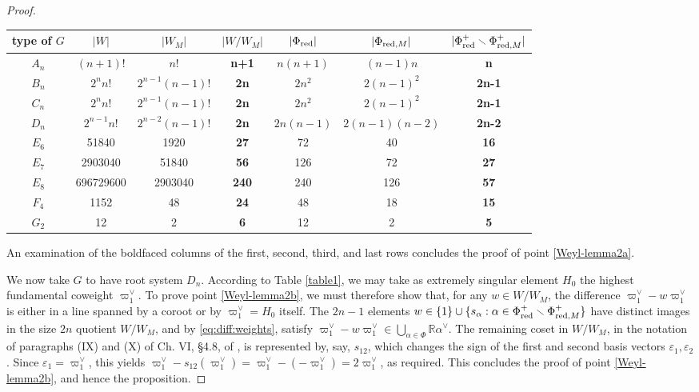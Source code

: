\documentclass[12pt]{amsart}
\theoremstyle{remark}
\newcommand{\R}{\mathbb R}
\begin{document}
\begin{proof}
\begin{table}[H]
 \begin{tabular}{|c|c|c|>{\bfseries} c|c|c|>{\bfseries}c|}
\hline  type of $G$ & $|W|$ & $|W_M|$ & $|W/W_M|$& $|\Phi_{\textnormal{red}}|$ & $|\Phi_{\textnormal{red},M}|$  & $|\Phi_{\textnormal{red}}^+ \smallsetminus \Phi_{\textnormal{red},M}^+|$ \\\hline
   $A_n$ & $(n+1)!$ & $n!$ &                            n+1&         $n(n+1)$ &  $(n-1)n$ & n\\
   $B_n$ & $2^n n!$ & $2^{n-1} (n-1)!$ &        2n &        $2n^2$ & $2(n-1)^2$ & 2n-1\\
   $C_n$ &  $2^n n!$ & $2^{n-1} (n-1)!$ &          2n &      $2n^2$ & $2(n-1)^2$ & 2n-1\\
   $D_n$ & $2^{n-1} n!$ & $2^{n-2} (n-1)!$ &        2n & $2n(n-1)$ & $2(n-1)(n-2)$ & 2n-2\\
   $E_6$ & 51840 & 1920                                       &27 & 72&   40 & 16\\
$E_7$ & 2903040 & 51840                                 &56 & 126 & 72 & 27 \\
   $E_8$ & 696729600 & 2903040                         &240& 240 &  126 & 57\\
   $F_4$ & 1152 & 48                                               &24&48 & 18 & 15\\
   $G_2$ & 12 & 2                                                 &6& 12& 2 & 5\\ 
   \hline
 \end{tabular}
 \end{table}
\noindent An examination of the boldfaced columns of the first, second, third, and last rows concludes the proof of point \eqref{Weyl-lemma2a}. 

We now take $G$ to have root system $D_n$. According to Table \ref{table1}, we may take as extremely singular element $H_0$ the highest fundamental coweight $\varpi_1^\vee$. To prove point \eqref{Weyl-lemma2b}, we must therefore show that, for any $w\in W/W_M$, the difference $\varpi_1^\vee-w\varpi_1^\vee$ is either in a line spanned by a coroot or by $\varpi_1^\vee=H_0$ itself. The $2n-1$ elements $w\in \{1\}\cup\{s_\alpha: \alpha \in \Phi_{\textnormal{red}}^+ \smallsetminus \Phi_{\textnormal{red},M}^+ \}$ have distinct images in the size $2n$ quotient $W/W_M$, and by \eqref{eq:diff:weights}, satisfy $\varpi_1^\vee-w\varpi_1^\vee\in \bigcup_{\alpha\in\Phi} \R\alpha^\vee$. The remaining coset in $W/W_M$, in the notation of paragraphs (IX) and (X) of Ch. VI, \S 4.8, of \cite{Bourbaki}, is represented by, say, $s_{12}$, which changes the sign of the first and second basis vectors $\varepsilon_1,\varepsilon_2$. Since $\varepsilon_1=\varpi_1^\vee$, this yields $\varpi_1^\vee-s_{12}(\varpi_1^\vee)=\varpi_1^\vee-(-\varpi_1^\vee)=2\varpi_1^\vee$, as required. This concludes the proof of point \eqref{Weyl-lemma2b}, and hence the proposition. \end{proof}
\end{document}
